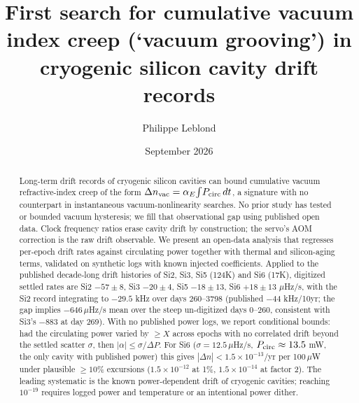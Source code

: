\documentclass[11pt, a4paper]{article}
\title{First search for cumulative vacuum index creep (`vacuum grooving') in cryogenic silicon cavity drift records}
\author{Philippe Leblond}
\date{September 2026}
\begin{document}
\maketitle

\begin{abstract}
Long-term drift records of cryogenic silicon cavities can bound cumulative vacuum refractive-index creep of the form $\Delta n_{\rm vac}=\alpha_E\!\int\! P_{\rm circ}\,dt$, a signature with no counterpart in instantaneous vacuum-nonlinearity searches. No prior study has tested or bounded vacuum hysteresis; we fill that observational gap using published open data. Clock frequency ratios erase cavity drift by construction; the servo's AOM correction is the raw drift observable. We present an open-data analysis that regresses per-epoch drift rates against circulating power together with thermal and silicon-aging terms, validated on synthetic logs with known injected coefficients. Applied to the published decade-long drift histories of Si2, Si3, Si5 (124K) and Si6 (17K), digitized settled rates are Si2 $-57\pm8$, Si3 $-20\pm4$, Si5 $-18\pm13$, Si6 $+18\pm13$ $\mu$Hz/s, with the Si2 record integrating to $-29.5$ kHz over days 260--3798 (published $-44$ kHz/10yr; the gap implies $-646\,\mu$Hz/s mean over the steep un-digitized days 0--260, consistent with Si3's $-883$ at day 269). With no published power logs, we report conditional bounds: had the circulating power varied by $\ge X$ across epochs with no correlated drift beyond the settled scatter $\sigma$, then $|\alpha|\le\sigma/\Delta P$. For Si6 ($\sigma=12.5\,\mu$Hz/s, $P_{\rm circ}\approx13.5$ mW, the only cavity with published power) this gives $|\Delta n|<1.5\times10^{-13}$/yr per 100\,$\mu$W under plausible $\ge10\%$ excursions ($1.5\times10^{-12}$ at 1\%, $1.5\times10^{-14}$ at factor 2). The leading systematic is the known power-dependent drift of cryogenic cavities; reaching $10^{-19}$ requires logged power and temperature or an intentional power dither.
\end{abstract}
\end{document}
